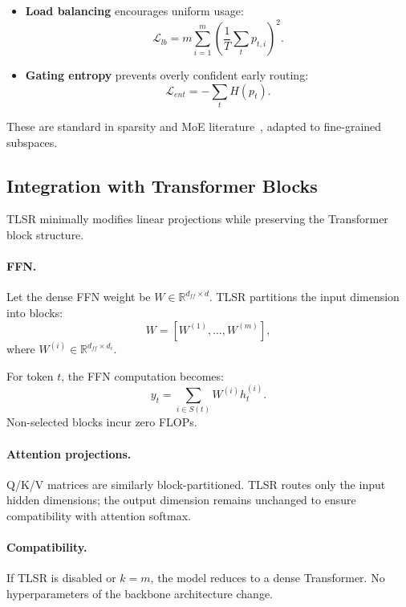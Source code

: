 \documentclass{article}
\theoremstyle{plain}
\theoremstyle{definition}
\theoremstyle{remark}
\begin{document}
\begin{itemize}
\item \textbf{Load balancing} encourages uniform usage:
\[
\mathcal{L}_{lb} = m \sum_{i=1}^m \left( \frac{1}{T} \sum_t p_{t,i} \right)^2.
\]
\item \textbf{Gating entropy} prevents overly confident early routing:
\[
\mathcal{L}_{ent} = - \sum_t H(p_t).
\]
\end{itemize}

These are standard in sparsity and MoE literature~\cite{li2023lazyneuron,liu2025teal}, adapted to fine-grained subspaces.

\subsection{Integration with Transformer Blocks}

TLSR minimally modifies linear projections while preserving the Transformer block structure.

\paragraph{FFN.}
Let the dense FFN weight be $W \in \mathbb{R}^{d_{ff} \times d}$.
TLSR partitions the input dimension into blocks:
\begin{equation}
W = [W^{(1)}, \dots, W^{(m)}],
\end{equation}
where $W^{(i)} \in \mathbb{R}^{d_{ff} \times d_i}$.

For token $t$, the FFN computation becomes:
\begin{equation}
y_t = \sum_{i \in S(t)} W^{(i)} h_t^{(i)}.
\end{equation}
Non-selected blocks incur zero FLOPs.

\paragraph{Attention projections.}
Q/K/V matrices are similarly block-partitioned.
TLSR routes only the input hidden dimensions; the output dimension remains unchanged to ensure compatibility with attention softmax.

\paragraph{Compatibility.}
If TLSR is disabled or $k = m$, the model reduces to a dense Transformer.
No hyperparameters of the backbone architecture change.
\end{document}
